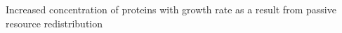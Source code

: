 Increased concentration of proteins with growth rate as a result from passive resource redistribution
